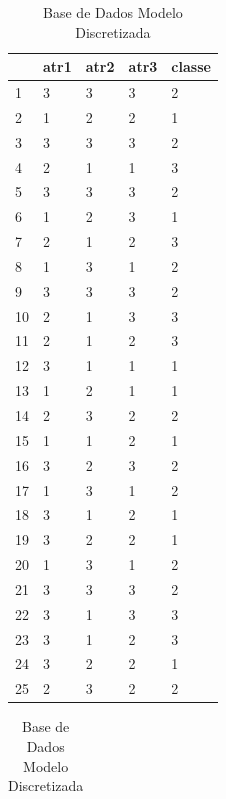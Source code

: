 \begin{table}[!ht]
\centering
\caption{Base de Dados Modelo Discretizada}
\label{tab:bdmd}
\begin{tabular}{|lllll|}
\hline 
  & atr1 & atr2 & atr3 & classe \\ \hline
1	&	3	&	3	&	3	&	2	\\	\hline
2	&	1	&	2	&	2	&	1	\\	\hline
3	&	3	&	3	&	3	&	2	\\	\hline
4	&	2	&	1	&	1	&	3	\\	\hline
5	&	3	&	3	&	3	&	2	\\	\hline
6	&	1	&	2	&	3	&	1	\\	\hline
7	&	2	&	1	&	2	&	3	\\	\hline
8	&	1	&	3	&	1	&	2	\\	\hline
9	&	3	&	3	&	3	&	2	\\	\hline
10	&	2	&	1	&	3	&	3	\\	\hline
11	&	2	&	1	&	2	&	3	\\	\hline
12	&	3	&	1	&	1	&	1	\\	\hline
13	&	1	&	2	&	1	&	1	\\	\hline
14	&	2	&	3	&	2	&	2	\\	\hline
15	&	1	&	1	&	2	&	1	\\	\hline
16	&	3	&	2	&	3	&	2	\\	\hline
17	&	1	&	3	&	1	&	2	\\	\hline
18	&	3	&	1	&	2	&	1	\\	\hline
19	&	3	&	2	&	2	&	1	\\	\hline
20	&	1	&	3	&	1	&	2	\\	\hline
21	&	3	&	3	&	3	&	2	\\	\hline
22	&	3	&	1	&	3	&	3	\\	\hline
23	&	3	&	1	&	2	&	3	\\	\hline
24	&	3	&	2	&	2	&	1	\\	\hline
25	&	2	&	3	&	2	&	2	\\	\hline
  \end{tabular}
  \begin{tabular}{ |lllll| }
   

\end{tabular}
\end{table}
